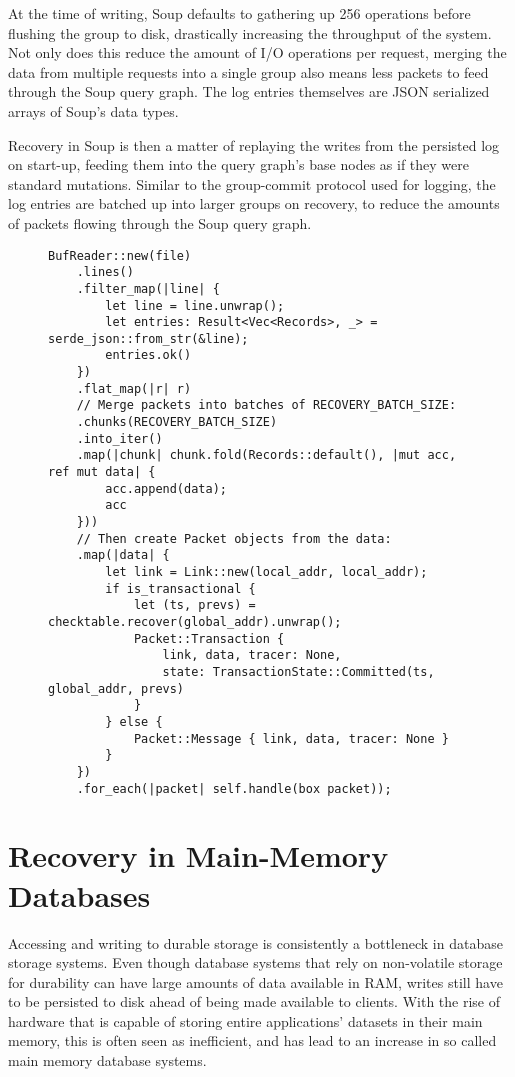 \documentclass[b5paper]{report}
\begin{document}
At the time of writing, Soup defaults to gathering up 256 operations before
flushing the group to disk, drastically increasing the throughput of the system.
Not only does this reduce the amount of I/O operations per request, merging the
data from multiple requests into a single group also means less packets to feed
through the Soup query graph. The log entries themselves are JSON \cite{json}
serialized arrays of Soup's data types.

Recovery in Soup is then a matter of replaying the writes from the persisted log
on start-up, feeding them into the query graph's base nodes as if they were
standard mutations. Similar to the group-commit protocol used for logging, the
log entries are batched up into larger groups on recovery, to reduce the amounts
of packets flowing through the Soup query graph.

\begin{figure}
\begin{lstlisting}[caption="Recovering from the Soup log"]
BufReader::new(file)
    .lines()
    .filter_map(|line| {
        let line = line.unwrap();
        let entries: Result<Vec<Records>, _> = serde_json::from_str(&line);
        entries.ok()
    })
    .flat_map(|r| r)
    // Merge packets into batches of RECOVERY_BATCH_SIZE:
    .chunks(RECOVERY_BATCH_SIZE)
    .into_iter()
    .map(|chunk| chunk.fold(Records::default(), |mut acc, ref mut data| {
        acc.append(data);
        acc
    }))
    // Then create Packet objects from the data:
    .map(|data| {
        let link = Link::new(local_addr, local_addr);
        if is_transactional {
            let (ts, prevs) = checktable.recover(global_addr).unwrap();
            Packet::Transaction {
                link, data, tracer: None,
                state: TransactionState::Committed(ts, global_addr, prevs)
            }
        } else {
            Packet::Message { link, data, tracer: None }
        }
    })
    .for_each(|packet| self.handle(box packet));
\end{lstlisting}
\end{figure}

\section{Recovery in Main-Memory Databases}
Accessing and writing to durable storage is consistently a bottleneck in
database storage systems. Even though database systems that rely on non-volatile
storage for durability can have large amounts of data available in RAM, writes
still have to be persisted to disk ahead of being made available to clients.
With the rise of hardware that is capable of storing entire applications'
datasets in their main memory, this is often seen as inefficient, and has lead
to an increase in so called main memory database systems.
\end{document}
